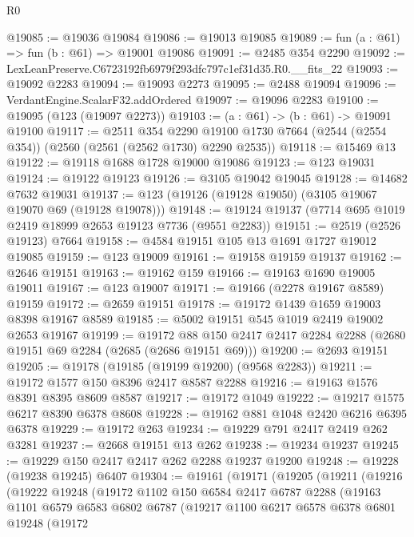 \begin{lexlean}{R0}
\begin{coremodule}
@19085 := @19036 @19084
@19086 := @19013 @19085
@19089 := fun (a : @61) => fun (b : @61) => @19001 @19086
@19091 := @2485 @354 @2290
@19092 := LexLeanPreserve.C6723192fb6979f293dfc797c1ef31d35.R0.__fits_22
@19093 := @19092 @2283
@19094 := @19093 @2273
@19095 := @2488 @19094
@19096 := VerdantEngine.ScalarF32.addOrdered
@19097 := @19096 @2283
@19100 := @19095 (@123 (@19097 @2273))
@19103 := (a : @61) -> (b : @61) -> @19091 @19100
@19117 := @2511
    @354
    @2290
    @19100
    @1730
    @7664
    (@2544 (@2554 @354))
    (@2560 (@2561 (@2562 @1730) @2290 @2535))
@19118 := @15469 @13
@19122 := @19118 @1688 @1728 @19000 @19086
@19123 := @123 @19031
@19124 := @19122 @19123
@19126 := @3105 @19042 @19045
@19128 := @14682 @7632 @19031
@19137 := @123 (@19126 (@19128 @19050) (@3105 @19067 @19070 @69 (@19128 @19078)))
@19148 := @19124 @19137 (@7714 @695 @1019 @2419 @18999 @2653 @19123 @7736 (@9551 @2283))
@19151 := @2519 (@2526 @19123) @7664
@19158 := @4584 @19151 @105 @13 @1691 @1727 @19012 @19085
@19159 := @123 @19009
@19161 := @19158 @19159 @19137
@19162 := @2646 @19151
@19163 := @19162 @159
@19166 := @19163 @1690 @19005 @19011
@19167 := @123 @19007
@19171 := @19166 (@2278 @19167 @8589) @19159
@19172 := @2659 @19151
@19178 := @19172 @1439 @1659 @19003 @8398 @19167 @8589
@19185 := @5002 @19151 @545 @1019 @2419 @19002 @2653 @19167
@19199 := @19172
    @88
    @150
    @2417
    @2417
    @2284
    @2288
    (@2680 @19151 @69 @2284 (@2685 (@2686 @19151 @69)))
@19200 := @2693 @19151
@19205 := @19178 (@19185 (@19199 @19200) (@9568 @2283))
@19211 := @19172 @1577 @150 @8396 @2417 @8587 @2288
@19216 := @19163 @1576 @8391 @8395 @8609 @8587
@19217 := @19172 @1049
@19222 := @19217 @1575 @6217 @8390 @6378 @8608
@19228 := @19162 @881 @1048 @2420 @6216 @6395 @6378
@19229 := @19172 @263
@19234 := @19229 @791 @2417 @2419 @262 @3281
@19237 := @2668 @19151 @13 @262
@19238 := @19234 @19237
@19245 := @19229 @150 @2417 @2417 @262 @2288 @19237 @19200
@19248 := @19228 (@19238 @19245) @6407
@19304 := @19161
    (@19171
      (@19205
        (@19211
          (@19216
            (@19222
              @19248
              (@19172
                @1102
                @150
                @6584
                @2417
                @6787
                @2288
                (@19163
                  @1101
                  @6579
                  @6583
                  @6802
                  @6787
                  (@19217
                    @1100
                    @6217
                    @6578
                    @6378
                    @6801
                    @19248
                    (@19172

\end{coremodule}
\end{lexlean}
